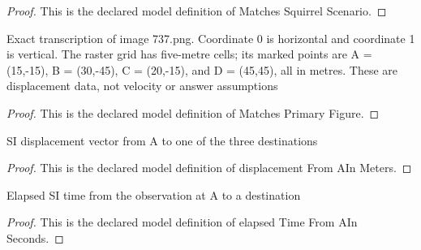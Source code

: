 \begin{proof}
  This is the declared model definition of Matches Squirrel Scenario.
\end{proof}
\begin{definition}
  \label{def:physics:phyx-mini-0737:phyxminiproblems-problemphyxmini0737-matchesprimaryfigure}
  Exact transcription of image 737.png. Coordinate 0 is horizontal and coordinate 1 is vertical. The raster grid has five-metre cells; its marked points are A = (15,-15), B = (30,-45), C = (20,-15), and D = (45,45), all in metres. These are displacement data, not velocity or answer assumptions
\end{definition}
\begin{proof}
  This is the declared model definition of Matches Primary Figure.
\end{proof}
\begin{definition}
  \label{def:physics:phyx-mini-0737:phyxminiproblems-problemphyxmini0737-displacementfromainmeters}
  SI displacement vector from A to one of the three destinations
\end{definition}
\begin{proof}
  This is the declared model definition of displacement From AIn Meters.
\end{proof}
\begin{definition}
  \label{def:physics:phyx-mini-0737:phyxminiproblems-problemphyxmini0737-elapsedtimefromainseconds}
  Elapsed SI time from the observation at A to a destination
\end{definition}
\begin{proof}
  This is the declared model definition of elapsed Time From AIn Seconds.
\end{proof}
